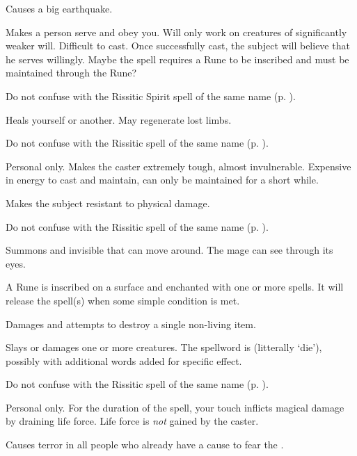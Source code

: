 Causes a big earthquake. 

Makes a person serve and obey you. Will only work on creatures of significantly weaker will. Difficult to cast. Once successfully cast, the subject will believe that he serves willingly. Maybe the spell requires a Rune to be inscribed and must be maintained through the Rune? 

Do not confuse with the Rissitic Spirit spell of the same name (p. \pageref{Rissitic spell Enslave}). 

Heals yourself or another. May regenerate lost limbs. 

Do not confuse with the Rissitic spell of the same name (p. \pageref{Rissitic spell Healing}). 

Personal only. Makes the caster extremely tough, almost invulnerable. Expensive in energy to cast and maintain, can only be maintained for a short while. 

Makes the subject resistant to physical damage. 

Do not confuse with the Rissitic spell of the same name (p. \pageref{Rissitic spell Iron Skin}). 

Summons and invisible \daemon{} that can move around. The mage can see through its eyes. 

A Rune is inscribed on a surface and enchanted with one or more spells. It will release the spell(s) when some simple condition is met. 

Damages and attempts to destroy a single non-living item. 

Slays or damages one or more creatures. The spellword is  (litterally `die'), possibly with additional words added for specific effect. 

Do not confuse with the Rissitic spell of the same name (p. \pageref{Rissitic spell Slay}). 

Personal only. For the duration of the spell, your touch inflicts magical damage by draining life force. Life force is \emph{not} gained by the caster. 

Causes terror in all people who already have a cause to fear the \dragon{}. 







